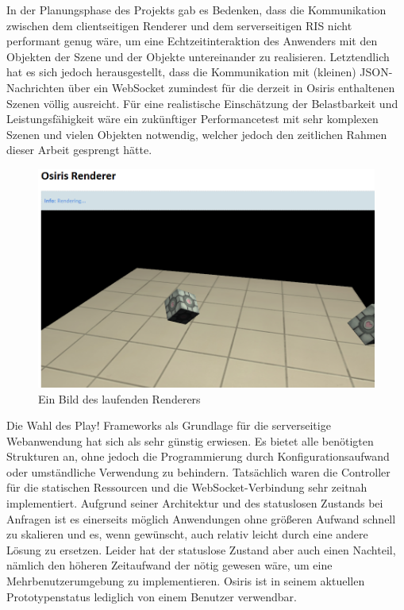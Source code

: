 In der Planungsphase des Projekts gab es Bedenken, dass die Kommunikation zwischen dem clientseitigen Renderer und dem serverseitigen RIS nicht performant genug wäre, um eine Echtzeitinteraktion des Anwenders mit den Objekten der Szene und der Objekte untereinander zu realisieren. Letztendlich hat es sich jedoch herausgestellt, dass die Kommunikation mit (kleinen) JSON-Nachrichten über ein WebSocket zumindest für die derzeit in Osiris enthaltenen Szenen völlig ausreicht. Für eine realistische Einschätzung der Belastbarkeit und Leistungsfähigkeit wäre ein zukünftiger Performancetest mit sehr komplexen Szenen und vielen Objekten notwendig, welcher jedoch den zeitlichen Rahmen dieser Arbeit gesprengt hätte.
\begin{figure}
\centering
\includegraphics[width=\textwidth]{bilder/osiris.png}
\caption{Ein Bild des laufenden Renderers}
\label{fig:osiris}
\end{figure}

Die Wahl des Play! Frameworks als Grundlage für die serverseitige Webanwendung hat sich als sehr günstig erwiesen. Es bietet alle benötigten Strukturen an, ohne jedoch die Programmierung durch Konfigurationsaufwand oder umständliche Verwendung zu behindern. Tatsächlich waren die Controller für die statischen Ressourcen und die WebSocket-Verbindung sehr zeitnah implementiert. Aufgrund seiner Architektur und des statuslosen Zustands bei Anfragen ist es einerseits möglich Anwendungen ohne größeren Aufwand schnell zu skalieren und es, wenn gewünscht, auch relativ leicht durch eine andere Lösung zu ersetzen. Leider hat der statuslose Zustand aber auch einen Nachteil, nämlich den höheren Zeitaufwand der nötig gewesen wäre, um eine Mehrbenutzerumgebung zu implementieren. Osiris ist in seinem aktuellen Prototypenstatus lediglich von einem Benutzer verwendbar.

